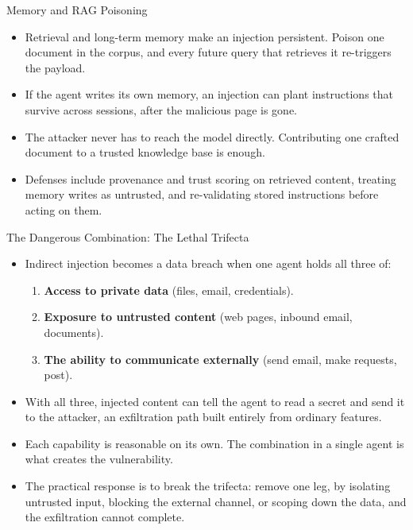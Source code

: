 \begin{frame}{Memory and RAG Poisoning}
  \begin{itemize}\itemsep0.5em
    \item[\textcolor{KAred}{$\blacktriangleright$}] Retrieval and long-term memory make an injection persistent. Poison one document in the corpus, and every future query that retrieves it re-triggers the payload.
    \item[\textcolor{KAred}{$\blacktriangleright$}] If the agent writes its own memory, an injection can plant instructions that survive across sessions, after the malicious page is gone.
    \item[\textcolor{KAred}{$\blacktriangleright$}] The attacker never has to reach the model directly. Contributing one crafted document to a trusted knowledge base is enough.
    \item[\textcolor{KAred}{$\blacktriangleright$}] Defenses include provenance and trust scoring on retrieved content, treating memory writes as untrusted, and re-validating stored instructions before acting on them.
  \end{itemize}
\end{frame}

\begin{frame}{The Dangerous Combination: The Lethal Trifecta}
  \begin{itemize}\itemsep0.5em
    \item[\textcolor{KAred}{$\blacktriangleright$}] Indirect injection becomes a data breach when one agent holds all three of:
      \begin{enumerate}\itemsep0.3em
        \item \textbf{Access to private data} (files, email, credentials).
        \item \textbf{Exposure to untrusted content} (web pages, inbound email, documents).
        \item \textbf{The ability to communicate externally} (send email, make requests, post).
      \end{enumerate}
    \item[\textcolor{KAred}{$\blacktriangleright$}] With all three, injected content can tell the agent to read a secret and send it to the attacker, an exfiltration path built entirely from ordinary features.
    \item[\textcolor{KAred}{$\blacktriangleright$}] Each capability is reasonable on its own. The combination in a single agent is what creates the vulnerability.
    \item[\textcolor{KAred}{$\blacktriangleright$}] The practical response is to break the trifecta: remove one leg, by isolating untrusted input, blocking the external channel, or scoping down the data, and the exfiltration cannot complete.
  \end{itemize}
\end{frame}
